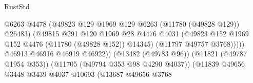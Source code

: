 \begin{lexlean}{RustStd}
\begin{coremodule}
                                                          @6263
                                                          @4478
                                                          (@49823
                                                            @129
                                                            @1969
                                                            @129
                                                            @6263
                                                            (@11780 (@49828 @129))
                                                            @26483)
                                                          (@49815
                                                            @291
                                                            @120
                                                            @1969
                                                            @28
                                                            @4476
                                                            @4031
                                                            (@49823
                                                              @152
                                                              @1969
                                                              @152
                                                              @4476
                                                              (@11780 (@49828 @152))
                                                              @14345)
                                                            (@11797 @49757 @3768)))))
                                                    @46913
                                                    @46916
                                                    @46919
                                                    @46922))
                                                (@13482 (@49783 @96))
                                                (@11821 (@49787 @1954 @353))
                                                (@11705 (@49794 @353 @98 @4290 @4037))
                                                (@11839
                                                  @49656
                                                  @3448
                                                  @3439
                                                  @4037
                                                  @10693
                                                  (@13687
                                                    @49656
                                                    @3768

\end{coremodule}
\end{lexlean}
